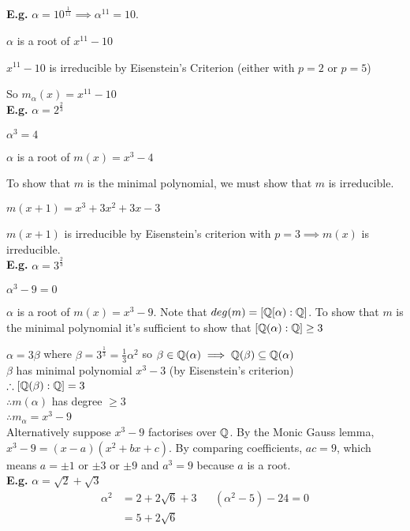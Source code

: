 \documentclass[11pt]{article}
\begin{document}
$ $\\
\textbf{E.g.} $\alpha = 10^\frac{1}{11} \implies \alpha^{11} = 10$.


$\alpha $ is a root of $x^{11} - 10$

$x^{11} -10 $ is irreducible by Eisenstein's Criterion (either with $p=2$ or $p=5$)

So $m_\alpha(x) = x^{11}-10 $ 
$ $\\[1em]
\textbf{E.g.} $\alpha = 2^{\frac{2}{3}}$

$\alpha^3 = 4$

$\alpha$ is a root of $m(x) = x^3 -4$

To show that $m$ is the minimal polynomial, we must show that $m$ is irreducible.

$m(x+1) = x^3 + 3x^2 +3x-3$

$m(x+1)$ is irreducible by Eisenstein's criterion with $p=3 \implies m(x) $ is irreducible.
$ $\\[1em]
\textbf{E.g.} $\alpha = 3^{\frac{2}{3}} $

$\alpha^3 - 9 = 0$

$\alpha$ is a root of $m(x) = x^3 -9 $.
Note that $deg(m) = [\mathbb{Q}[\alpha):\mathbb{Q}]$.
To show that $m$ is the minimal polynomial it's sufficient to show that $[\mathbb{Q}(\alpha) : \mathbb{Q}] \geq 3$

$\alpha = 3\beta$ where $\beta = 3^{\frac{1}{3}} = \frac{1}{3}\alpha^2$ so $\beta \in \mathbb{Q}(\alpha) \implies \mathbb{Q}(\beta) \subseteq \mathbb{Q}(\alpha)$
$ $\\[-0.5em]

$\beta $ has minimal polynomial $x^3 - 3$ (by Eisenstein's criterion)
$ $\\[-0.5em]

$\therefore [\mathbb{Q}(\beta):\mathbb{Q}] = 3$
$ $\\[-.5em]

$\therefore m(\alpha)$ has degree $\geq 3$
$ $\\[-.5em]

$\therefore m_\alpha = x^3 -9$ 
$ $\\[1em]
Alternatively suppose $x^3 -9$ factorises over $\mathbb{Q}$.
By the Monic Gauss lemma, $x^3 -9 = (x-a)(x^2 +bx+c)$.
By comparing coefficients, $ac=9$, which means $a = \pm 1$ or $\pm 3$ or $\pm 9$ and $a^3 = 9$ because $a$ is a root. \lightning
$ $\\[1em]
\textbf{E.g.} $ \alpha = \sqrt{2} + \sqrt{3} $
\begin{align*}
	\alpha^2 & = 2+2\sqrt{6} +3 && (\alpha^2 - 5) -24 = 0\\
	& = 5 + 2\sqrt{6}
\end{align*}
\end{document}
